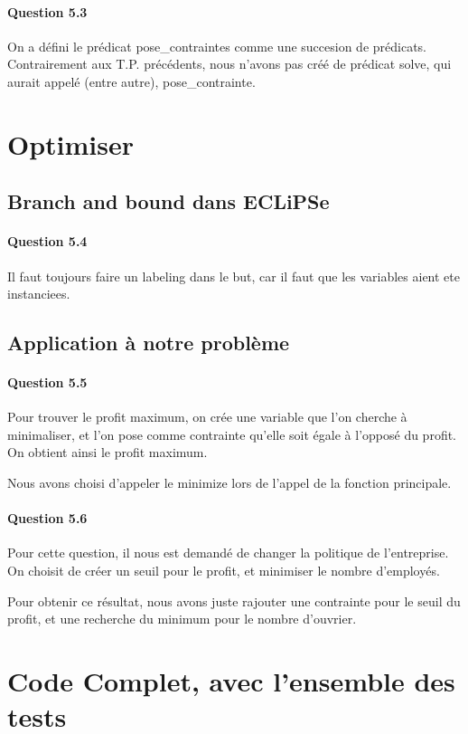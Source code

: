 \documentclass[11pt]{article} %
\begin{document}
\paragraph{Question 5.3} 
On a défini le prédicat pose\_contraintes comme une succesion de prédicats. Contrairement aux T.P. précédents, nous n'avons pas créé de prédicat solve, qui aurait appelé (entre autre), pose\_contrainte.

\section{Optimiser}
\subsection{Branch and bound dans ECLiPSe}
\paragraph{Question 5.4} Il faut toujours faire un labeling dans le but,
car il faut que les variables aient ete instanciees.



\subsection{Application à notre problème}
\paragraph{Question 5.5} Pour trouver le profit maximum, on crée une variable que l'on cherche à minimaliser, et l'on pose comme contrainte qu'elle soit égale à l'opposé du profit. On obtient ainsi le profit maximum.

Nous avons choisi d'appeler le minimize lors de l'appel de la fonction principale.
\paragraph{Question 5.6}
Pour cette question, il nous est demandé de changer la politique de l'entreprise. On choisit de créer un seuil pour le profit, et minimiser le nombre d'employés.

Pour obtenir ce résultat, nous avons juste rajouter une contrainte pour le seuil du profit, et une recherche du minimum pour le nombre d'ouvrier.
\newpage

\section{Code Complet, avec l'ensemble des tests}

\end{document}
